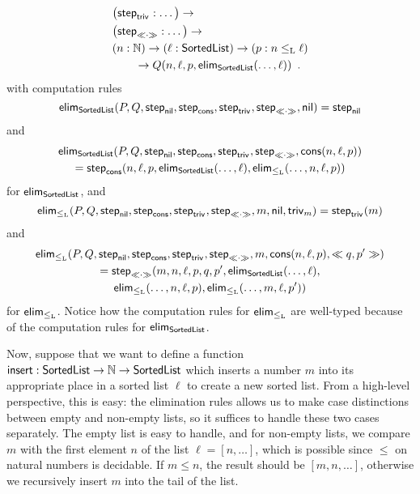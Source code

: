 \documentclass{article}
\begin{document}
\begin{example}
\begin{align*}
                       & \big(\stepind{\nilLess{}} : \ldots\big) \to \\
                       & \big(\stepind{\consLessbare} : \ldots\big) \to \\
                       & (n : \Nat) \to (\ell : \SortedList) \to (p : n \lessList \ell) \\
                       & \qquad \to Q(n, \ell, p, \elim_{\SortedList}(\ldots, \ell)) \enspace .
  \end{align*}
with computation rules
%
\[
\elim_{\SortedList}(P, Q, \stepind{\nilList}, \stepind{\consListbare}, \stepind{\nilLess{}}, \stepind{\consLessbare}, \nilList) = \stepind{\nilList}
\]
and
\begin{multline*}
\elim_{\SortedList}(P, Q, \stepind{\nilList}, \stepind{\consListbare}, \stepind{\nilLess{}}, \stepind{\consLessbare}, \consList{n}{\ell}{p}) \\
= \stepind{\consListbare}(n, \ell, p, \elim_{\SortedList}(\ldots, \ell), 
\elim_{\lessList}(\ldots, n, \ell, p))  
\end{multline*}
%
for $\elim_{\SortedList}$, and
\[
\elim_{\lessList}(P, Q, \stepind{\nilList}, \stepind{\consListbare}, \stepind{\nilLess{}}, \stepind{\consLessbare}, m, \nilList, \nilLess{m}) = \stepind{\nilLess{}}(m)
\]
and
\begin{multline*}
\elim_{\lessList}(P, Q, \stepind{\nilList}, \stepind{\consListbare}, \stepind{\nilLess{}}, \stepind{\consLessbare}, m, \consList{n}{\ell}{p}, \consLess{m}{n}{\ell}{p}{q}{p'}) \\
= \stepind{\consLessbare}(m, n, \ell, p, q, p', \elim_{\SortedList}(\ldots, \ell), \\
\elim_{\lessList}(\ldots, n, \ell, p), \elim_{\lessList}(\ldots, m, \ell, p'))
\end{multline*}
for $\elim_{\lessList}$. Notice how the computation rules for
$\elim_{\lessList}$ are well-typed because of the computation rules
for $\elim_{\SortedList}$.

Now, suppose that we want to define a function $\Listinsert :
\SortedList \to \Nat \to \SortedList$ which inserts a number $m$ into
its appropriate place in a sorted list $\ell$ to create a new sorted
list. From a high-level perspective, this is easy: the elimination
rules allows us to make case distinctions between empty and non-empty
lists, so it suffices to handle these two cases separately. The empty
list is easy to handle, and for non-empty lists, we compare $m$ with
the first element $n$ of the list $\ell = [n, \ldots]$, which is
possible since $\leq$ on natural numbers is decidable. If $m \leq n$,
the result should be $[m, n, \ldots]$, otherwise we recursively insert
$m$ into the tail of the list.


\end{example}
\end{document}
